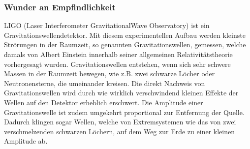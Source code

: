 \documentclass[letterpaper,10pt,english]{jupyterBook}
\begin{document}
\subsubsection{Wunder an Empfindlichkeit}
\label{\detokenize{content/2_idealeKennlinie:wunder-an-empfindlichkeit}}
\sphinxAtStartPar
LIGO (Laser Interferometer Gravitational\sphinxhyphen{}Wave Observatory) ist ein Gravitationswellendetektor. Mit diesem experimentellen Aufbau werden kleinste Strörungen in der Raumzeit, so genannten Gravitationswellen, gemessen, welche damals von Albert Einstein innerhalb seiner allgemeinen Relativitätstheorie vorhergesagt wurden. Gravitationswellen entstehen, wenn sich sehr schwere Massen in der Raumzeit bewegen, wie z.B. zwei schwarze Löcher oder Neutronensterne, die umeinander kreisen. Die direkt Nachweis von Gravitationswellen wird durch wie wirklich verschwindend kleinen Effekte der Wellen auf den Detektor erheblich erschwert. Die Amplitude einer Gravitationswelle ist zudem umgekehrt proportional zur Entfernung der Quelle. Dadurch klingen sogar Wellen, welche von Extremsystemen wie das von zwei verschmelzenden schwarzen Löchern, auf dem Weg zur Erde zu einer kleinen Amplitude ab.
\end{document}
